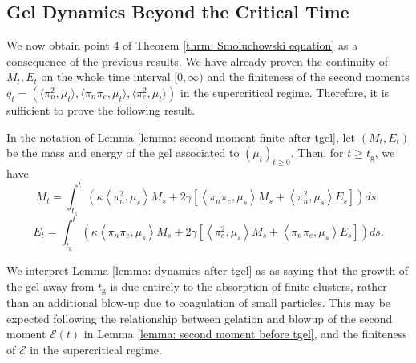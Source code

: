 \subsection{Gel Dynamics Beyond the Critical Time} We now obtain point 4 of Theorem \ref{thrm: Smoluchowski equation}  as a consequence of the previous results. We have already proven the continuity of $M_t, E_t$ on the whole time interval $[0,\infty)$ and the finiteness of the second moments $q_t=(\langle  \pi_n^2, \mu_t\rangle, \langle  \pi_n\pi_e, \mu_t\rangle, \langle  \pi_e^2, \mu_t\rangle)$ in the supercritical regime. Therefore, it is sufficient to prove the following result.
\begin{lemma}\label{lemma: dynamics after tgel} In the notation of Lemma \ref{lemma: second moment finite after tgel}, let $(M_t, E_t)$ be the mass and energy of the gel associated to $(\mu_t)_{t\ge 0}$. Then, for  $t\ge t_\mathrm{g}$, we have
\begin{equation}
    M_t=\int_{t_\mathrm{g}}^t 
    \left(
      \kappa \left<\pi_n^2,\mu_s\right>M_s +
      2\gamma \left[
        \left<\pi_n \pi_e,\mu_s \right>M_s +
        \left<\pi_n^2,\mu_s \right>E_s \right]
    \right)ds;
\end{equation}
\begin{equation}
    E_t=\int_{t_\mathrm{g}}^t 
    \left(
      \kappa \left<\pi_n \pi_e,\mu_s\right>M_s +
      2\gamma \left[
        \left<\pi_e^2,\mu_s \right>M_s +
        \left<\pi_n \pi_e,\mu_s \right>E_s \right]
    \right)ds.
\end{equation}\end{lemma} \begin{remark}\label{rmk: continuity of tgelt} We interpret Lemma \ref{lemma: dynamics after tgel} as as saying that the growth of the gel away from $t_\mathrm{g}$ is due entirely to the absorption of finite clusters, rather than an additional blow-up due to coagulation of small particles. This may be expected following the relationship between gelation and blowup of the second moment $\mathcal{E}(t)$ in Lemma \ref{lemma: second moment before tgel}, and the finiteness of $\mathcal{E}$ in the supercritical regime. \end{remark}
